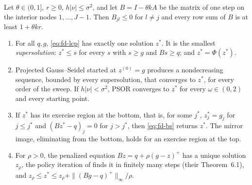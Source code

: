 \begin{proposition}\label{prop:fd-american}
Let $\theta\in(0,1]$, $r\ge0$, $h|\nu|\le\sigma^2$, and let $B=I-\theta kA$ be the matrix of one step on the
interior nodes $1,\dots,J-1$. Then $B_{jl}\le0$ for $l\ne j$ and every row sum of $B$ is at least
$1+\theta kr$.
\begin{enumerate}[label=(\roman*)]
  \item For all $q,g$, \eqref{eq:fd-lcp} has exactly one solution $z^*$. It is the smallest
    \emph{supersolution}: $z^*\le s$ for every $s$ with $s\ge g$ and $Bs\ge q$; and $z^*=\Phi(z^*)$.
  \item Projected Gauss--Seidel started at $z^{(0)}=g$ produces a nondecreasing sequence, bounded by
    every supersolution, that converges to $z^*$, for every order of the sweep. If $h|\nu|<\sigma^2$,
    PSOR converges to $z^*$ for every $\omega\in(0,2)$ and every starting point.
  \item If $z^*$ has its exercise region at the bottom, that is, for some $j^*$, $z^*_j=g_j$ for
    $j\le j^*$ and $(Bz^*-q)_j=0$ for $j>j^*$, then \eqref{eq:fd-bs} returns $z^*$. The mirror image,
    eliminating from the bottom, holds for an exercise region at the top.
  \item For $\rho>0$, the penalized equation $Bz=q+\rho(g-z)^+$ has a unique solution $z_\rho$, the
    policy iteration of \textcite{forsyth-vetzal-2002} finds it in finitely many steps (their
    Theorem~6.1), and $z_\rho\le z^*\le z_\rho+\|(Bg-q)^+\|_\infty/\rho$.
\end{enumerate}
\end{proposition}

